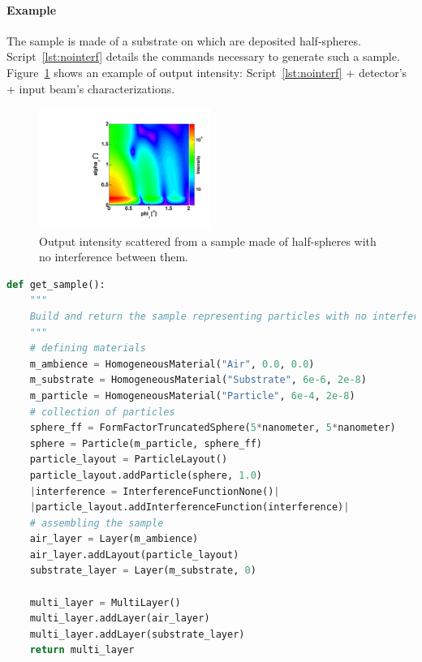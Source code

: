 \paragraph{Example} The sample is made of a substrate on which are deposited half-spheres. Script~\ref{lst:nointerf} details the commands necessary to generate such a sample. Figure~\ref{fig:nointerf} shows an example of output intensity: Script~\ref{lst:nointerf}  + detector's + input beam's characterizations.


\begin{figure}[tb]
\begin{center}
\includegraphics[angle=-90,width=0.5\textwidth]{fig/gisasmap/HSphere_NoInterf.pdf}
\end{center}
\caption{Output intensity scattered from a sample made of half-spheres with no interference between them.}
\label{fig:nointerf}
\end{figure}

\FloatBarrier
\newpage

\begin{lstlisting}[language=python, style=eclipseboxed,numbers=none,nolol,caption={\Code{Python} script to simulate a sample made of half-spheres deposited on a substrate layer without any interference. The part specific to the interferences is marked in a red italic font.},label={lst:nointerf}]
def get_sample():
    """
    Build and return the sample representing particles with no interference
    """
    # defining materials
    m_ambience = HomogeneousMaterial("Air", 0.0, 0.0)
    m_substrate = HomogeneousMaterial("Substrate", 6e-6, 2e-8)
    m_particle = HomogeneousMaterial("Particle", 6e-4, 2e-8)
    # collection of particles
    sphere_ff = FormFactorTruncatedSphere(5*nanometer, 5*nanometer)
    sphere = Particle(m_particle, sphere_ff)
    particle_layout = ParticleLayout()
    particle_layout.addParticle(sphere, 1.0)
    |interference = InterferenceFunctionNone()|
    |particle_layout.addInterferenceFunction(interference)|
    # assembling the sample
    air_layer = Layer(m_ambience)
    air_layer.addLayout(particle_layout)
    substrate_layer = Layer(m_substrate, 0)

    multi_layer = MultiLayer()
    multi_layer.addLayer(air_layer)
    multi_layer.addLayer(substrate_layer)
    return multi_layer
\end{lstlisting}

